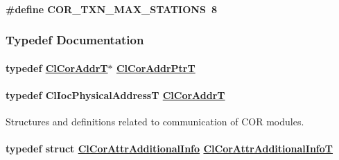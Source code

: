 \hypertarget{group__group13_ga320}{
\paragraph[COR\_\-TXN\_\-MAX\_\-STATIONS]{\setlength{\rightskip}{0pt plus 5cm}\#define COR\_\-TXN\_\-MAX\_\-STATIONS~8}\hfill}
\label{group__group13_ga320}




\subsubsection{Typedef Documentation}
\hypertarget{group__group13_ga22}{
\paragraph[ClCorAddrPtrT]{\setlength{\rightskip}{0pt plus 5cm}typedef \hyperlink{group__group13_ga21}{Cl\-Cor\-Addr\-T}$\ast$ \hyperlink{group__group13_ga22}{Cl\-Cor\-Addr\-Ptr\-T}}\hfill}
\label{group__group13_ga22}


\hypertarget{group__group13_ga21}{
\paragraph[ClCorAddrT]{\setlength{\rightskip}{0pt plus 5cm}typedef Cl\-Ioc\-Physical\-Address\-T \hyperlink{group__group13_ga21}{Cl\-Cor\-Addr\-T}}\hfill}
\label{group__group13_ga21}


Structures and definitions related to communication of COR modules. \hypertarget{group__group13_ga12}{
\paragraph[ClCorAttrAdditionalInfoT]{\setlength{\rightskip}{0pt plus 5cm}typedef struct \hyperlink{struct_cl_cor_attr_additional_info}{Cl\-Cor\-Attr\-Additional\-Info} \hyperlink{struct_cl_cor_attr_additional_info}{Cl\-Cor\-Attr\-Additional\-Info\-T}}\hfill}
\label{group__group13_ga12}


